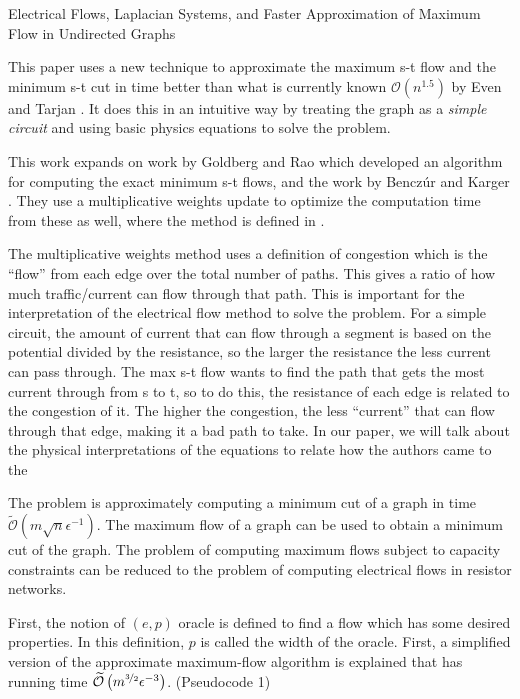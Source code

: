 \documentclass{article}
\begin{document}
\begin{center}
{\huge Electrical Flows, Laplacian Systems, and Faster Approximation of Maximum Flow in Undirected Graphs }
\end{center}

This paper uses a new technique to approximate the maximum s-t flow and the minimum s-t cut in time better than what is currently known $\mathcal{O}\left( n^{1.5}\right)$  by Even and Tarjan \cite{Even}. It does this in an intuitive way by treating the graph as a {\em simple circuit} and using basic physics equations to solve the problem.

This work expands on work by Goldberg and Rao \cite{Goldberg} which developed an algorithm for computing the exact minimum s-t flows, and the work by Bencz\'{u}r and Karger \cite{Benczur}. They use a multiplicative weights update to optimize the computation time from these as well, where the method is defined in \cite{Arora, Plotkin}. 

The multiplicative weights method uses a definition of congestion which is the “flow” from each edge over the total number of paths. This gives a ratio of how much traffic/current can flow through that path. This is important for the interpretation of the electrical flow method to solve the problem. For a simple circuit, the amount of current that can flow through a segment is based on the potential divided by the resistance, so the larger the resistance the less current can pass through. The max s-t flow wants to find the path that gets the most current through from s to t, so to do this, the resistance of each edge is related to the congestion of it. The higher the congestion, the less “current” that can flow through that edge, making it a bad path to take. In our paper, we will talk about the physical interpretations of the equations to relate how the authors came to the 

The problem is approximately computing a minimum cut of a graph in time $\widetilde{\mathcal{O}}\left( m\sqrt{n}\epsilon^{-1}\right)$. The maximum flow of a graph can be used to obtain a minimum cut of the graph. The problem of computing maximum flows subject to capacity constraints can be reduced to the problem of computing electrical flows in resistor networks. 

First, the notion of $(e,p)$ oracle is defined to find a flow which has some desired properties. In this definition, $p$ is called the width of the oracle. First, a simplified version of the approximate maximum-flow algorithm is explained that has running time $\widetilde{\mathcal{O}}\left( m^{\unitfrac{3}{2}} \epsilon^{-3}\right)$. (Pseudocode 1)
\end{document}
